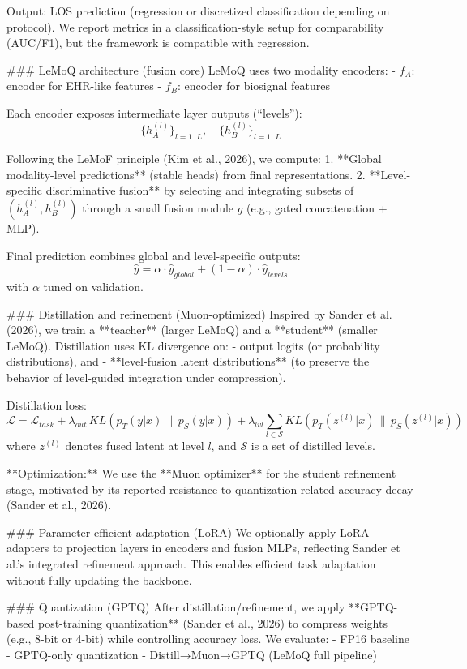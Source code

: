 Output: LOS prediction (regression or discretized classification depending on protocol). We report metrics in a classification-style setup for comparability (AUC/F1), but the framework is compatible with regression.

### LeMoQ architecture (fusion core)  
LeMoQ uses two modality encoders:
- \( f_A \): encoder for EHR-like features  
- \( f_B \): encoder for biosignal features  

Each encoder exposes intermediate layer outputs (“levels”):  
\[
\{h_A^{(l)}\}_{l=1..L}, \quad \{h_B^{(l)}\}_{l=1..L}
\]

Following the LeMoF principle (Kim et al., 2026), we compute:
1. **Global modality-level predictions** (stable heads) from final representations.  
2. **Level-specific discriminative fusion** by selecting and integrating subsets of \((h_A^{(l)}, h_B^{(l)})\) through a small fusion module \(g\) (e.g., gated concatenation + MLP).

Final prediction combines global and level-specific outputs:
\[
\hat{y} = \alpha \cdot \hat{y}_{global} + (1-\alpha)\cdot \hat{y}_{levels}
\]
with \(\alpha\) tuned on validation.

### Distillation and refinement (Muon-optimized)  
Inspired by Sander et al. (2026), we train a **teacher** (larger LeMoQ) and a **student** (smaller LeMoQ). Distillation uses KL divergence on:
- output logits (or probability distributions), and  
- **level-fusion latent distributions** (to preserve the behavior of level-guided integration under compression).

Distillation loss:
\[
\mathcal{L} = \mathcal{L}_{task} + \lambda_{out} \, KL(p_T(y|x)\,\|\,p_S(y|x)) + \lambda_{lvl}\sum_{l\in \mathcal{S}} KL(p_T(z^{(l)}|x)\,\|\,p_S(z^{(l)}|x))
\]
where \(z^{(l)}\) denotes fused latent at level \(l\), and \(\mathcal{S}\) is a set of distilled levels.

**Optimization:** We use the **Muon optimizer** for the student refinement stage, motivated by its reported resistance to quantization-related accuracy decay (Sander et al., 2026).

### Parameter-efficient adaptation (LoRA)  
We optionally apply LoRA adapters to projection layers in encoders and fusion MLPs, reflecting Sander et al.’s integrated refinement approach. This enables efficient task adaptation without fully updating the backbone.

### Quantization (GPTQ)  
After distillation/refinement, we apply **GPTQ-based post-training quantization** (Sander et al., 2026) to compress weights (e.g., 8-bit or 4-bit) while controlling accuracy loss. We evaluate:
- FP16 baseline  
- GPTQ-only quantization  
- Distill→Muon→GPTQ (LeMoQ full pipeline)

